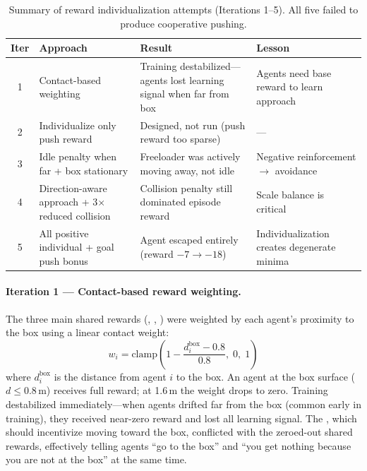 \begin{table}[H]
  \centering
  \caption{Summary of reward individualization attempts (Iterations 1--5). All five failed to produce cooperative pushing.}
  \label{tab:reward_indiv_summary}
  \begin{tabular}{clp{5.5cm}p{4.5cm}}
    \toprule
    \textbf{Iter} & \textbf{Approach} & \textbf{Result} & \textbf{Lesson} \\
    \midrule
    1 & Contact-based weighting & Training destabilized---agents lost learning signal when far from box & Agents need base reward to learn approach \\
    2 & Individualize only push reward & Designed, not run (push reward too sparse) & --- \\
    3 & Idle penalty when far + box stationary & Freeloader was actively moving away, not idle & Negative reinforcement $\to$ avoidance \\
    4 & Direction-aware approach + 3$\times$ reduced collision & Collision penalty still dominated episode reward & Scale balance is critical \\
    5 & All positive individual + goal push bonus & Agent escaped entirely (reward $-7 \to -18$) & Individualization creates degenerate minima \\
    \bottomrule
  \end{tabular}
\end{table}

\paragraph{Iteration 1 --- Contact-based reward weighting.}
The three main shared rewards (, , ) were weighted by each agent's proximity to the box using a linear contact weight:
\begin{equation}
  w_i = \text{clamp}\!\left(1 - \frac{d_i^{\text{box}} - 0.8}{0.8},\; 0,\; 1\right)
  \label{eq:contact_weight}
\end{equation}
where $d_i^{\text{box}}$ is the distance from agent $i$ to the box. An agent at the box surface ($d \leq 0.8$\,m) receives full reward; at 1.6\,m the weight drops to zero. Training destabilized immediately---when agents drifted far from the box (common early in training), they received near-zero reward and lost all learning signal. The , which should incentivize moving toward the box, conflicted with the zeroed-out shared rewards, effectively telling agents ``go to the box'' and ``you get nothing because you are not at the box'' at the same time.

